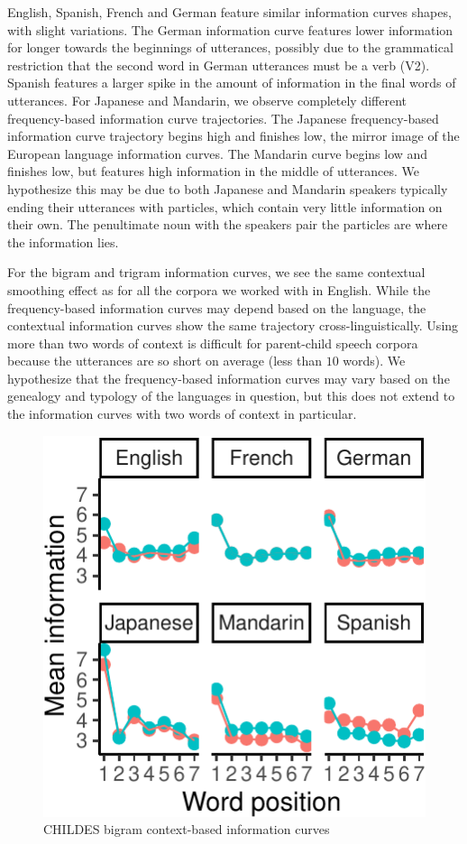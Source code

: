 \documentclass[man,floatsintext]{apa6}
\begin{document}
English, Spanish, French and German feature similar information curves shapes, with slight variations. The German information curve features lower information for longer towards the beginnings of utterances, possibly due to the grammatical restriction that the second word in German utterances must be a verb (V2). Spanish features a larger spike in the amount of information in the final words of utterances. For Japanese and Mandarin, we observe completely different frequency-based information curve trajectories. The Japanese frequency-based information curve trajectory begins high and finishes low, the mirror image of the European language information curves. The Mandarin curve begins low and finishes low, but features high information in the middle of utterances. We hypothesize this may be due to both Japanese and Mandarin speakers typically ending their utterances with particles, which contain very little information on their own. The penultimate noun with the speakers pair the particles are where the information lies.

For the bigram and trigram information curves, we see the same contextual smoothing effect as for all the corpora we worked with in English. While the frequency-based information curves may depend based on the language, the contextual information curves show the same trajectory cross-linguistically. Using more than two words of context is difficult for parent-child speech corpora because the utterances are so short on average (less than \(10\) words). We hypothesize that the frequency-based information curves may vary based on the genealogy and typology of the languages in question, but this does not extend to the information curves with two words of context in particular.

\begin{figure}
\centering
\includegraphics{figs/unnamed-chunk-2-1.pdf}
\caption{\label{fig:unnamed-chunk-2}CHILDES bigram context-based information curves}
\end{figure}
\end{document}
